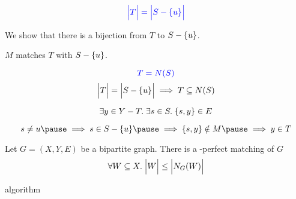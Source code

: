 \begin{frame}{}
  \begin{center}
    \[
      \textcolor{blue}{\Big\lvert T \Big\rvert = \Big\lvert S - \{u\} \Big\rvert}
    \]

    \pause
    \vspace{0.30cm}
    We show that there is a bijection from $T$ to $S - \{u\}$.

    \pause
    $M$ matches $T$ with $S - \{u\}$.
  \end{center}
\end{frame}

\begin{frame}{}
  \begin{center}
    \[
      \textcolor{blue}{T = N(S)}
    \]
    \pause
    \[
      \Big\lvert T \Big\rvert = \Big\lvert S - \{u\} \Big\rvert \implies T \subseteq N(S)
    \]

    \pause
    \pause
    \[
      \exists y \in Y - T.\; \exists s \in S.\; \{s, y\} \in E
    \]

    \pause
    \[
      s \neq u \pause \implies s \in S - \set{u} \pause
                      \implies \set{s, y} \notin M \pause
                      \implies y \in T
    \]
  \end{center}
\end{frame}

\begin{frame}{}
  \begin{theorem}
    Let $G = (X, Y, E)$ be a bipartite graph.
    There is a -perfect matching of $G$ 
    \[
      \forall W \subseteq X.\; \Big\lvert W \Big\rvert \le \Big\lvert N_{G}(W) \Big\rvert
    \]
  \end{theorem}
\end{frame}

\begin{frame}{}
  algorithm
\end{frame}

\begin{frame}{}
\end{frame}
